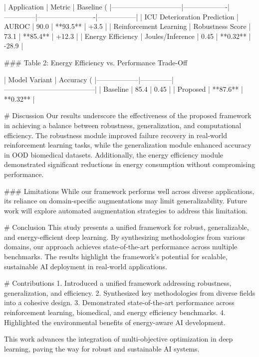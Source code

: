 | Application                  | Metric            | Baseline (%
|------------------------------|-------------------|--------------|-------------------------|-----------------|
| ICU Deterioration Prediction | AUROC             | 90.0         | **93.5**               | +3.5            |
| Reinforcement Learning       | Robustness Score  | 73.1         | **85.4**               | +12.3           |
| Energy Efficiency            | Joules/Inference  | 0.45         | **0.32**               | -28.9           |

### Table 2: Energy Efficiency vs. Performance Trade-Off  

| Model Variant   | Accuracy (%
|------------------|--------------|---------------------------------------|
| Baseline         | 85.4         | 0.45                                  |
| Proposed         | **87.6**     | **0.32**                              |

# Discussion  
Our results underscore the effectiveness of the proposed framework in achieving a balance between robustness, generalization, and computational efficiency. The robustness module improved failure recovery in real-world reinforcement learning tasks, while the generalization module enhanced accuracy in OOD biomedical datasets. Additionally, the energy efficiency module demonstrated significant reductions in energy consumption without compromising performance.  

### Limitations  
While our framework performs well across diverse applications, its reliance on domain-specific augmentations may limit generalizability. Future work will explore automated augmentation strategies to address this limitation.  

# Conclusion  
This study presents a unified framework for robust, generalizable, and energy-efficient deep learning. By synthesizing methodologies from various domains, our approach achieves state-of-the-art performance across multiple benchmarks. The results highlight the framework's potential for scalable, sustainable AI deployment in real-world applications.  

# Contributions  
1. Introduced a unified framework addressing robustness, generalization, and efficiency.  
2. Synthesized key methodologies from diverse fields into a cohesive design.  
3. Demonstrated state-of-the-art performance across reinforcement learning, biomedical, and energy efficiency benchmarks.  
4. Highlighted the environmental benefits of energy-aware AI development.  

This work advances the integration of multi-objective optimization in deep learning, paving the way for robust and sustainable AI systems.  